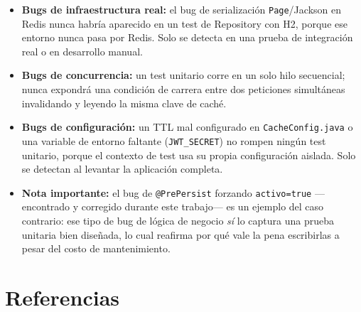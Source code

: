 \documentclass[12pt]{article}
\begin{document}
	\begin{itemize}
		\item \textbf{Bugs de infraestructura real:} el bug de serialización \texttt{Page}/Jackson en Redis nunca habría aparecido en un test de Repository con H2, porque ese entorno nunca pasa por Redis. Solo se detecta en una prueba de integración real o en desarrollo manual.
		
		\item \textbf{Bugs de concurrencia:} un test unitario corre en un solo hilo secuencial; nunca expondrá una condición de carrera entre dos peticiones simultáneas invalidando y leyendo la misma clave de caché.
		
		\item \textbf{Bugs de configuración:} un TTL mal configurado en \texttt{CacheConfig.java} o una variable de entorno faltante (\texttt{JWT\_SECRET}) no rompen ningún test unitario, porque el contexto de test usa su propia configuración aislada. Solo se detectan al levantar la aplicación completa.
		
		\item \textbf{Nota importante:} el bug de \texttt{@PrePersist} forzando \texttt{activo=true} —encontrado y corregido durante este trabajo— es un ejemplo del caso contrario: ese tipo de bug de lógica de negocio \textit{sí} lo captura una prueba unitaria bien diseñada, lo cual reafirma por qué vale la pena escribirlas a pesar del costo de mantenimiento.
	\end{itemize}
	
	\newpage
	
	\section*{Referencias}
	
\end{document}
